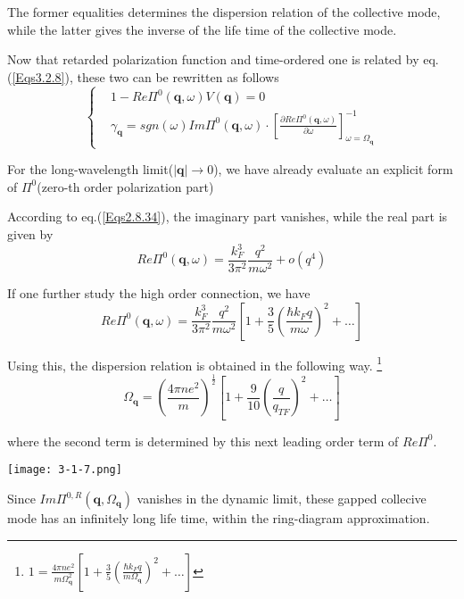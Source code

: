 The former equalities determines the dispersion relation of the collective mode, while the latter gives the inverse of the life time of the collective mode.

Now that retarded polarization function and time-ordered one is related by eq.(\ref{Eqs3.2.8}), these two can be rewritten as follows
\begin{equation*} \label{Eqs3.2.12'} \tag{3.2.12'}
\left\{ \begin{split}
&1- Re\Pi^{0}(\mathbf{q},\omega) V(\mathbf{q}) = 0\\
&\gamma_{\mathbf{q}} = sgn(\omega) Im \Pi^{0}(\mathbf{q},\omega) \cdot 
 \left[ \frac{\partial Re \Pi^{0}(\mathbf{q},\omega)}{\partial \omega} \right]_{\omega=\Omega_{\mathbf{q}}}^{-1}
\end{split} \right.
\end{equation*}

For the long-wavelength limit($|\mathbf{q}| \rightarrow 0$), we have already evaluate an explicit form of $\Pi^0$(zero-th order polarization part)

According to eq.(\ref{Eqs2.8.34}), the imaginary part vanishes, while the real part is given by
\[Re \Pi^0(\mathbf{q},\omega) = \frac{k_F^3}{3\pi^2}\frac{q^2}{m\omega^2} + o(q^4)\]

If one further study the high order connection, we have
\[Re \Pi^0(\mathbf{q},\omega) = \frac{k_F^3}{3\pi^2}\frac{q^2}{m\omega^2}\left[ 1+\frac{3}{5}\left( \frac{\hbar k_F q}{m \omega} \right)^2+\ldots \right]\]

Using this, the dispersion relation is obtained in the following way.
\footnote{$1 = \frac{4\pi n e^2}{m \Omega_{\mathbf{q}}^2}\left[ 1+\frac{3}{5}\left( \frac{\hbar k_F q}{m \Omega_{\mathbf{q}}} \right)^2+\ldots \right]$}
\begin{equation} \label{Eqs3.2.13}
\Omega_{\mathbf{q}} = \left(\frac{4\pi n e^2}{m}\right)^{\frac{1}{2}}\left[ 1+\frac{9}{10}\left( \frac{q}{q_{TF}} \right)^2+\ldots \right]
\end{equation}

where the second term is determined by this next leading order term of $Re \Pi^0$.

\begin{center} \label{Fig3.1.7}
\texttt{[image: 3-1-7.png]}
\end{center}

Since $Im \Pi^{0,R}(\mathbf{q},\Omega_{\mathbf{q}})$ vanishes in the dynamic limit, these gapped collecive mode has an infinitely long life time, within the ring-diagram approximation.

